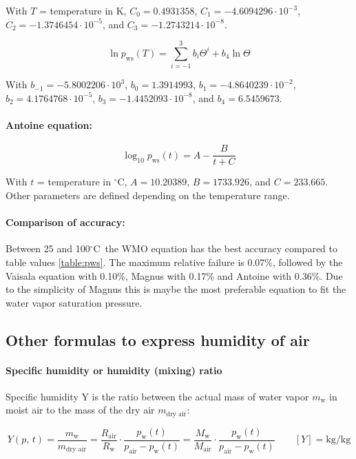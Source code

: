 \documentclass[11pt,a4paper,english,twoside]{scrreprt}
\newcommand{\gradC}{${}^\circ$C}      %
\begin{document}
With $T$ = temperature in K, $C_0 = 0.4931358$, $C_1 = -4.6094296 \cdot 10^{-3}$, $C_2 = -1.3746454 \cdot 10^{-5}$, and $C_3 = -1.2743214 \cdot 10^{-8}$. 

\[\ln p_\text{ws}(T) = \sum_{i=-1}^3 b_i \Theta^i + b_4 \ln \Theta\]

With $b_{-1} = -5.8002206 \cdot 10^3$, $b_0 = 1.3914993$, $b_1 = -4.8640239 \cdot 10^{-2}$, $b_2 = 4.1764768 \cdot 10^{-5}$, $b_3 = -1.4452093 \cdot 10^{-8}$, and $b_4 = 6.5459673$.

\paragraph{Antoine equation:}
\[\log_{10} p_\text{ws}(t) = A - \frac{B}{t + C}\]

With $t$ = temperature in \gradC, $A = 10.20389$, $B = 1733.926$, and $C = 233.665$. Other parameters are defined depending on the temperature range.  

\paragraph{Comparison of accuracy:} Between 25 and 100\gradC\ the WMO equation has the best accuracy compared to table values \ref{table:pws}. The maximum relative failure is 0.07\%, followed by the Vaisala equation with 0.10\%, Magnus with 0.17\% and Antoine with 0.36\%. Due to the simplicity of Magnus this is maybe the most preferable equation to fit the water vapor saturation pressure.

\subsection{Other formulas to express humidity of air}

\paragraph{Specific humidity or humidity (mixing) ratio}

Specific humidity Y is the ratio between the actual mass of water vapor $m_\text{w}$ in moist air to the mass of the dry air $m_\text{dry air}$:

\begin{equation}
  \label{eqn:Y}
  Y(p,\,t)=\frac{m_\text{w}}{m_\text{dry air}} =\frac{R_\text{air} }{R_\text{w} } \cdot \frac{p_\text{w}(t)}{p_\text{air} - p_\text{w}(t)} 
  =\frac{M_\text{w}}{M_\text{air}} \cdot \frac{p_\text{w}(t)}{p_\text{air} - p_\text{w}(t)}  \qquad [Y]= \si{\kilo\gram\per\kilo\gram}
\end{equation}
\end{document}
